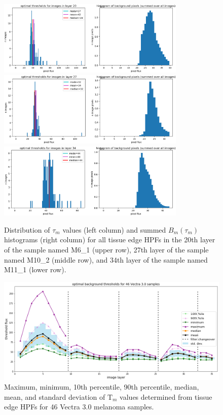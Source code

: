 \documentclass[letterpaper,11pt]{article}
\newcommand{\Tau}{\mathrm{T}}
\begin{document}
\begin{figure}[!ht]
\centering
\includegraphics[width=0.80\textwidth]{images/masking/M6_1_layer_20_background_threshold_plots}
\includegraphics[width=0.80\textwidth]{images/masking/M10_2_layer_27_background_threshold_plots}
\includegraphics[width=0.80\textwidth]{images/masking/M11_1_layer_34_background_threshold_plots}
\caption{\footnotesize Distribution of $\tau_{m}$ values (left column) and summed $B_{m}(\tau_{m})$ histograms (right column) for all tissue edge HPFs in the 20th layer of the sample named M6\_1 (upper row), 27th layer of the sample named M10\_2 (middle row), and 34th layer of the sample named M11\_1 (lower row).}
\label{fig:threshold_distributions_2}
\end{figure}

\begin{figure}[!ht]
\centering
\includegraphics[width=\textwidth]{images/masking/optimal_background_thresholds_batches_3-9_samples}
\caption{\footnotesize Maximum, minimum, 10th percentile, 90th percentile, median, mean, and standard deviation of $\Tau_{m}$ values determined from tissue edge HPFs for 46 Vectra 3.0 melanoma samples.}
\label{fig:all_sample_thresholds}
\end{figure}
\end{document}
